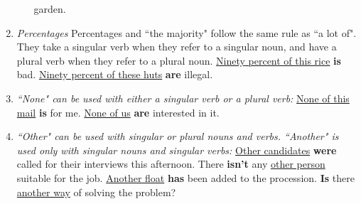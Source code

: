 \begin{enumerate}
\begin{enumerate}
                garden.
        \end{enumerate}
    \item
        {\it
        Percentages
        }
        \newline
        \newline
        Percentages and ``the majority" follow the same rule as ``a lot of".
        They take a singular verb when they refer to a singular noun, and have a
        plural verb when they refer to a plural noun.
        \newline
        \newline
        \underline{Ninety percent of this rice} \textbf{is} bad.
        \newline
        \newline
        \underline{Ninety percent of these huts} \textbf{are} illegal.
    \item
        {\it
        ``None" can be used with either a singular verb or a plural verb:
        }
        \newline
        \newline
        \underline{None of this mail} \textbf{is} for me.
        \newline
        \newline
        \underline{None of us} \textbf{are} interested in it.
    \item
        {\it
        ``Other" can be used with singular or plural nouns and verbs.
        \newline
        ``Another" is used only with singular nouns and singular verbs:
        }
        \newline
        \newline
        \underline{Other candidates} \textbf{were} called for their interviews
        this afternoon.
        \newline
        \newline
        There \textbf{isn't} any \underline{other person} suitable for the job.
        \newline
        \newline
        \underline{Another float} \textbf{has} been added to the procession.
        \newline
        \newline
        \textbf{Is} there \underline{another way} of solving the problem?
\end{enumerate}
